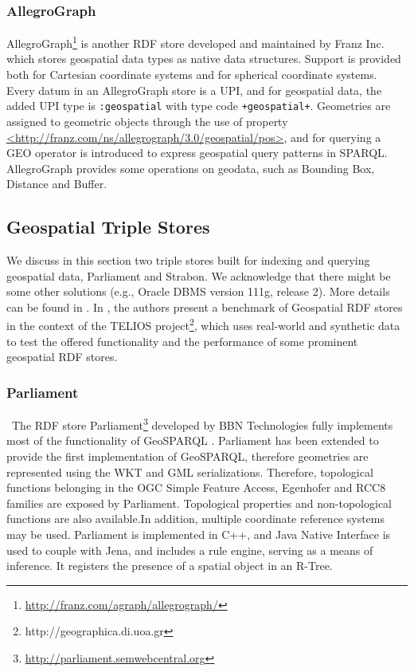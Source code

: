 \subsubsection{AllegroGraph}
AllegroGraph\footnote{\url{http://franz.com/agraph/allegrograph/}} is another RDF store developed and maintained by Franz Inc. which stores geospatial data types as native data structures. Support is provided both for Cartesian coordinate systems and for spherical coordinate systems. Every datum in an AllegroGraph store is a UPI, and for geospatial data, the added UPI type is \texttt{:geospatial} with type code \texttt{+geospatial+}. Geometries are assigned to geometric objects through the use of property \url{<http://franz.com/ns/allegrograph/3.0/geospatial/pos>}, and for querying a GEO operator is introduced to express geospatial query patterns in SPARQL. AllegroGraph provides some operations on geodata, such as Bounding Box, Distance and Buffer. 


    

\subsection{Geospatial Triple Stores}
\label{sec:geotps}
We discuss in this section two triple stores built for indexing and querying geospatial data, Parliament and Strabon. We acknowledge that there might be some other solutions (e.g., Oracle DBMS version 111g, release 2). More details can be found in \cite{koubarakis12, battle12, garbis13}. In \cite{garbis13}, the authors present a benchmark of Geospatial RDF stores in the context of the TELIOS project\footnote{http://geographica.di.uoa.gr}, which uses real-world and synthetic data to test the offered functionality and the performance of some prominent geospatial RDF stores. 

\subsubsection{Parliament}
\
The RDF store Parliament\footnote{\url{http://parliament.semwebcentral.org}} developed by BBN Technologies fully implements most of the functionality of GeoSPARQL \cite{battle12}. 
Parliament has been extended to provide the first implementation of GeoSPARQL, therefore geometries are represented using the WKT and GML serializations.
Therefore, topological functions belonging in the OGC Simple Feature Access, Egenhofer and RCC8 families are exposed by Parliament.
Topological properties and non-topological functions are also available.In addition, multiple coordinate reference systems may be used. Parliament is implemented in C++, and Java Native Interface is used to couple with Jena, and includes a rule engine, serving as a means of inference. It registers the presence of a spatial object in an R-Tree.

